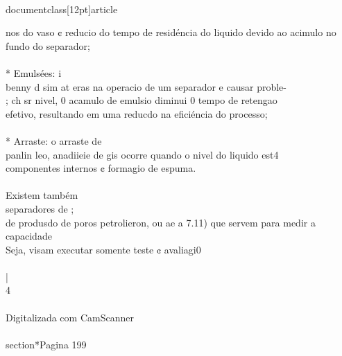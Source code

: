 \\documentclass[12pt]{article}
\begin{document}
nos do vaso ¢ reducio do tempo de residéncia do liquido devido ao acimulo no\\
fundo do separador;\\
\\
* Emulsées: i\\
benny d sim at eras na operacio de um separador e causar proble-\\
; ch sr nivel, 0 acamulo de emulsio diminui 0 tempo de retengao\\
efetivo, resultando em uma reducdo na eficiéncia do processo;\\
\\
* Arraste: o arraste de\\
panlin leo, anadiieie de gis ocorre quando o nivel do liquido est4\\
componentes internos ¢ formagio de espuma.\\
\\
Existem também\\
separadores de ;\\
de produsdo de poros petrolieron, ou ae a 7.11) que servem para medir a capacidade\\
Seja, visam executar somente teste ¢ avaliagi0\\
\\
|\\
4\\
\\
Digitalizada com CamScanner\\

\\section*{Pagina 199}
\end{document}
